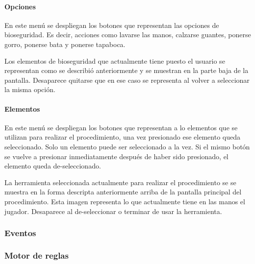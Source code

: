 \paragraph{Opciones}

En este menú se despliegan los botones que representan las opciones de
bioseguridad. Es decir, acciones como lavarse las manos, calzarse guantes,
ponerse gorro, ponerse bata y ponerse tapaboca.

Los elementos de bioseguridad que actualmente tiene puesto el usuario se
representan como se describió anteriormente y se muestran en la parte baja de la
pantalla. Desaparece quitarse que en ese caso se representa al volver a
seleccionar la misma opción.

\paragraph{Elementos}

En este menú se despliegan los botones que representan a lo elementos que se
utilizan para realizar el procedimiento, una vez presionado ese elemento queda
seleccionado. Solo un elemento puede ser seleccionado a la vez. Si el mismo
botón se vuelve a presionar inmediatamente después de haber sido presionado, el
elemento queda de-seleccionado.


La herramienta seleccionada actualmente para realizar el procedimiento se se
muestra en la forma descripta anteriormente arriba de la pantalla principal del
procedimiento. Esta imagen representa lo que actualmente tiene en las manos el
jugador. Desaparece al de-seleccionar o terminar de usar la herramienta.


\subsubsection{Eventos}
\subsubsection{Motor de reglas}

